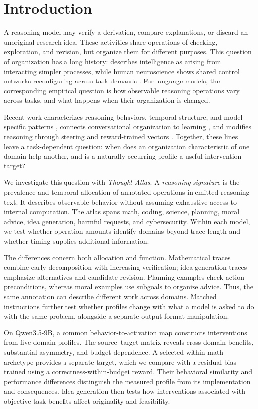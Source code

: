 \section{Introduction}
A reasoning model may verify a derivation, compare explanations, or discard an unoriginal research idea. These activities share operations of checking, exploration, and revision, but organize them for different purposes. This question of organization has a long history: \citet{minsky1986society} describes intelligence as arising from interacting simpler processes, while human neuroscience shows shared control networks reconfiguring across task demands \citep{cole2013hubs}. For language models, the corresponding empirical question is how observable reasoning operations vary across tasks, and what happens when their organization is changed.

Recent work characterizes reasoning behaviors, temporal structure, and model-specific patterns \citep{gandhi2025habits,chen2025lot,li2025thinkarm,lee2026reasonops}, connects conversational organization to learning \citep{kim2026society}, and modifies reasoning through steering and reward-trained vectors \citep{chen2025seal,sinii2025vectors}. Together, these lines leave a task-dependent question: when does an organization characteristic of one domain help another, and is a naturally occurring profile a useful intervention target?

We investigate this question with \emph{Thought Atlas}. A \emph{reasoning signature} is the prevalence and temporal allocation of annotated operations in emitted reasoning text. It describes observable behavior without assuming exhaustive access to internal computation. The atlas spans math, coding, science, planning, moral advice, idea generation, harmful requests, and cybersecurity. Within each model, we test whether operation amounts identify domains beyond trace length and whether timing supplies additional information.

The differences concern both allocation and function. Mathematical traces combine early decomposition with increasing verification; idea-generation traces emphasize alternatives and candidate revision. Planning examples check action preconditions, whereas moral examples use subgoals to organize advice. Thus, the same annotation can describe different work across domains. Matched instructions further test whether profiles change with what a model is asked to do with the same problem, alongside a separate output-format manipulation.

On Qwen3.5-9B, a common behavior-to-activation map constructs interventions from five domain profiles. The source--target matrix reveals cross-domain benefits, substantial asymmetry, and budget dependence. A selected within-math archetype provides a separate target, which we compare with a residual bias trained using a correctness-within-budget reward. Their behavioral similarity and performance differences distinguish the measured profile from its implementation and consequences. Idea generation then tests how interventions associated with objective-task benefits affect originality and feasibility.

